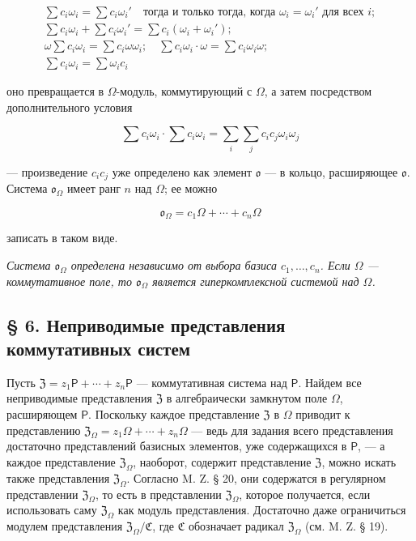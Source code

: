 \documentclass[11pt]{article}
\begin{document}
\[
\begin{array}{l}
\sum c_i\omega_i=\sum c_i\omega_i' \quad\text{тогда и только тогда, когда } \omega_i=\omega_i' \text{ для всех } i;\\
\sum c_i\omega_i+\sum c_i\omega_i'=\sum c_i(\omega_i+\omega_i');\\
\omega\sum c_i\omega_i=\sum c_i\omega\omega_i;\quad
\sum c_i\omega_i\cdot\omega=\sum c_i\omega_i\omega;\\
\sum c_i\omega_i=\sum \omega_i c_i
\end{array}
\]

оно превращается в \(\Omega\)-модуль, коммутирующий с \(\Omega\), а затем посредством дополнительного условия

\[
\sum c_i\omega_i\cdot \sum c_i\omega_i
=\sum_i\sum_j c_ic_j\omega_i\omega_j
\]

--- произведение \(c_ic_j\) уже определено как элемент \(\mathfrak{o}\) --- в кольцо, расширяющее \(\mathfrak{o}\). Система \(\mathfrak{o}_{\Omega}\) имеет ранг \(n\) над \(\Omega\); ее можно

\[
\mathfrak{o}_{\Omega}=c_1\Omega+\cdots+c_n\Omega
\]

записать в таком виде.

\emph{Система \(\mathfrak{o}_{\Omega}\) определена независимо от выбора базиса \(c_1,\ldots,c_n\). Если \(\Omega\) --- коммутативное поле, то \(\mathfrak{o}_{\Omega}\) является гиперкомплексной системой над \(\Omega\).}

\subsection*{§ 6. Неприводимые представления коммутативных систем}\label{die-irreduziblen-darstellungen-kommutativer-systeme}

Пусть \(\mathfrak Z=z_1\mathsf P+\cdots+z_n\mathsf P\) --- коммутативная система над \(\mathsf P\). Найдем все неприводимые представления \(\mathfrak Z\) в алгебраически замкнутом поле \(\Omega\), расширяющем \(\mathsf P\). Поскольку каждое представление \(\mathfrak Z\) в \(\Omega\) приводит к представлению \(\mathfrak Z_\Omega=z_1\Omega+\cdots+z_n\Omega\) --- ведь для задания всего представления достаточно представлений базисных элементов, уже содержащихся в \(\mathsf P\), --- а каждое представление \(\mathfrak Z_\Omega\), наоборот, содержит представление \(\mathfrak Z\), можно искать также представления \(\mathfrak Z_\Omega\). Согласно M. Z. § 20, они содержатся в регулярном представлении \(\mathfrak Z_\Omega\), то есть в представлении \(\mathfrak Z_\Omega\), которое получается, если использовать саму \(\mathfrak Z_\Omega\) как модуль представления. Достаточно даже ограничиться модулем представления \(\mathfrak Z_\Omega/\mathfrak C\), где \(\mathfrak C\) обозначает радикал \(\mathfrak Z_\Omega\) (см. M. Z. § 19).
\end{document}
